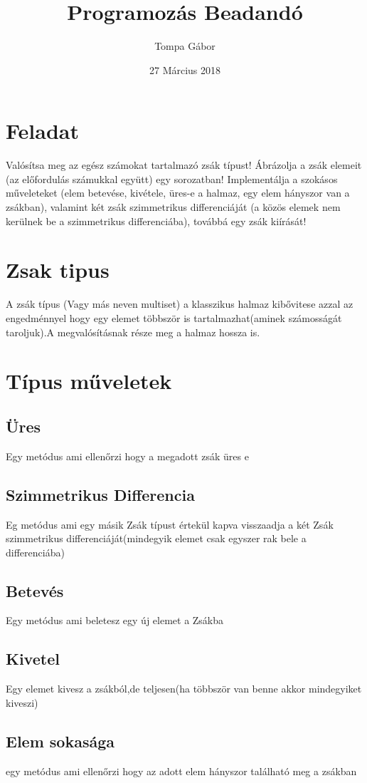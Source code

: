 \documentclass{article}
\title{Programozás Beadandó}
\author{Tompa Gábor }
\date{27 Március 2018}
\begin{document}
\maketitle

\section{Feladat}
Valósítsa meg az egész számokat tartalmazó zsák típust! Ábrázolja a zsák elemeit (az
előfordulás számukkal együtt) egy sorozatban! Implementálja a szokásos
műveleteket (elem betevése, kivétele, üres-e a halmaz, egy elem hányszor van a
zsákban), valamint két zsák szimmetrikus differenciáját (a közös elemek nem
kerülnek be a szimmetrikus differenciába), továbbá egy zsák kiírását!
\section{Zsak tipus}
A zsák típus (Vagy más neven multiset) a klasszikus halmaz kibővitese azzal az engedménnyel hogy egy elemet többször is tartalmazhat(aminek számosságát taroljuk).A megvalósításnak része meg a halmaz hossza is.
\section{Típus műveletek}
\subsection{Üres}
Egy metódus ami ellenőrzi hogy a megadott zsák üres e
\subsection{Szimmetrikus Differencia}

Eg metódus ami egy másik Zsák típust értekül kapva visszaadja a két Zsák szimmetrikus differenciáját(mindegyik elemet csak egyszer rak bele a differenciába)
\subsection{Betevés}
Egy metódus ami beletesz egy új elemet a Zsákba
\subsection{Kivetel}
Egy elemet kivesz a zsákból,de teljesen(ha többször van benne akkor mindegyiket kiveszi)
\subsection{Elem sokasága}
egy metódus ami ellenőrzi hogy az adott elem hányszor található meg a zsákban
\end{document}
